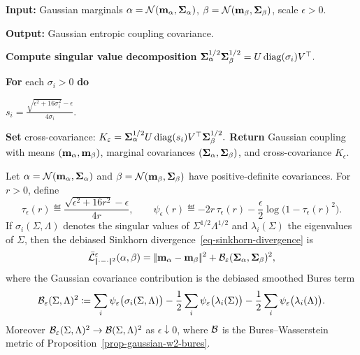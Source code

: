 \begin{alg}\label{alg:gaussian-sinkhorn-closed-form}
\textbf{Input:} Gaussian marginals $\alpha=\mathcal{N}(\mathbf{m}_\alpha,\mathbf{\Sigma}_\alpha)$, $\beta=\mathcal{N}(\mathbf{m}_\beta,\mathbf{\Sigma}_\beta)$, scale $\epsilon>0$.

\textbf{Output:} Gaussian entropic coupling covariance.

\textbf{Compute singular value decomposition}
\(\mathbf{\Sigma}_\alpha^{1/2}\mathbf{\Sigma}_\beta^{1/2} = U\operatorname{diag}(\sigma_i)V^\top .\)

\textbf{For} each $\sigma_i>0$ \textbf{do}
\begin{algblock}
\(s_i=\frac{\sqrt{\epsilon^2+16\sigma_i^2}-\epsilon}{4\sigma_i}.\)
\end{algblock}
\textbf{Set} cross-covariance:
\(K_\varepsilon = \mathbf{\Sigma}_\alpha^{1/2}U\operatorname{diag}(s_i)V^\top\mathbf{\Sigma}_\beta^{1/2}.\)
\textbf{Return} Gaussian coupling with means $(\mathbf{m}_\alpha,\mathbf{m}_\beta)$, marginal covariances $(\mathbf{\Sigma}_\alpha,\mathbf{\Sigma}_\beta)$, and cross-covariance $K_\epsilon$.
\end{alg}

\begin{cor}\label{cor-gaussian-sinkhorn-divergence}
	Let $\alpha=\mathcal{N}(\mathbf{m}_\alpha,\mathbf{\Sigma}_\alpha)$ and $\beta=\mathcal{N}(\mathbf{m}_\beta,\mathbf{\Sigma}_\beta)$ have positive-definite covariances. For $r>0$, define
	\[
		\tau_\epsilon(r)
		\eqdef
		\frac{\sqrt{\epsilon^2+16r^2}-\epsilon}{4r},
		\qquad
		\psi_\epsilon(r)
		\eqdef
		-2r\,\tau_\epsilon(r)
		-\frac{\epsilon}{2}\log\bigl(1-\tau_\epsilon(r)^2\bigr).
	\]
	If $\sigma_i(\Sigma,\Lambda)$ denotes the singular values of $\Sigma^{1/2}\Lambda^{1/2}$ and $\lambda_i(\Sigma)$ the eigenvalues of $\Sigma$, then the debiased Sinkhorn divergence~\eqref{eq-sinkhorn-divergence} is
	\[
		\bar{\mathcal{L}}_{|\!| \cdot-\cdot |\!|^2}^{\varepsilon}(\alpha,\beta)
		=
		|\!| \mathbf{m}_\alpha-\mathbf{m}_\beta |\!|^2
		+
		\mathcal{B}_\varepsilon(\mathbf{\Sigma}_\alpha,\mathbf{\Sigma}_\beta)^2,
	\]
	where the Gaussian covariance contribution is the debiased smoothed Bures term
	\[
		\mathcal{B}_\varepsilon(\Sigma,\Lambda)^2
		\coloneqq
		\sum_i \psi_\varepsilon\bigl(\sigma_i(\Sigma,\Lambda)\bigr)
		-\frac12\sum_i\psi_\varepsilon\bigl(\lambda_i(\Sigma)\bigr)
		-\frac12\sum_i\psi_\varepsilon\bigl(\lambda_i(\Lambda)\bigr).
	\]
	Moreover $\mathcal{B}_\varepsilon(\Sigma,\Lambda)^2\to\mathcal{B}(\Sigma,\Lambda)^2$ as $\epsilon\downarrow0$, where $\mathcal{B}$ is the Bures--Wasserstein metric of Proposition~\ref{prop-gaussian-w2-bures}.
\end{cor}

